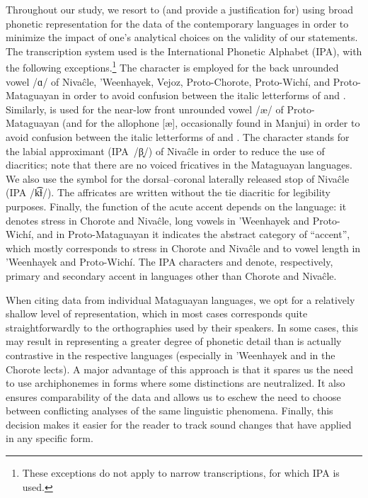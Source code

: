 Throughout our study, we resort to (and provide a justification for) using broad phonetic representation for the data of the contemporary languages in order to minimize the impact of one’s analytical choices on the validity of our statements. The transcription system used is the International Phonetic Alphabet (IPA), with the following exceptions.\footnote{These exceptions do not apply to narrow transcriptions, for which IPA is used.} The character  is employed for the back unrounded vowel /ɑ/ of Nivaĉle, ’Weenhayek, Vejoz, Proto-Chorote, Proto-Wichí, and Proto-Mataguayan in order to avoid confusion between the italic letterforms of  and . Similarly,  is used for the near-low front unrounded vowel /æ/ of Proto-Mataguayan (and for the allophone [æ], occasionally found in Manjui) in order to avoid confusion between the italic letterforms of  and . The character  stands for the labial approximant (IPA~/β̞/) of Nivaĉle in order to reduce the use of diacritics; note that there are no voiced fricatives in the Mataguayan languages. We also use the symbol  for the dorsal–coronal laterally released stop of Nivaĉle (IPA /k͡ɫ/). The affricates are written without the tie diacritic for legibility purposes. Finally, the function of the acute accent depends on the language: it denotes stress in Chorote and Nivaĉle, long vowels in ’Weenhayek and Proto-Wichí, and in Proto-Mataguayan it indicates the abstract category of ``accent'', which mostly corresponds to stress in Chorote and Nivaĉle and to vowel length in ’Weenhayek and Proto-Wichí. The IPA characters  and  denote, respectively, primary and secondary accent in languages other than Chorote and Nivaĉle.

When citing data from individual Mataguayan languages, we opt for a relatively shallow level of representation, which in most cases corresponds quite straightforwardly to the orthographies used by their speakers. In some cases, this may result in representing a greater degree of phonetic detail than is actually contrastive in the respective languages (especially in ’Weenhayek and in the Chorote lects). A major advantage of this approach is that it spares us the need to use archiphonemes in forms where some distinctions are neutralized. It also ensures comparability of the data and allows us to eschew the need to choose between conflicting analyses of the same linguistic phenomena. Finally, this decision makes it easier for the reader to track sound changes that have applied in any specific form.

